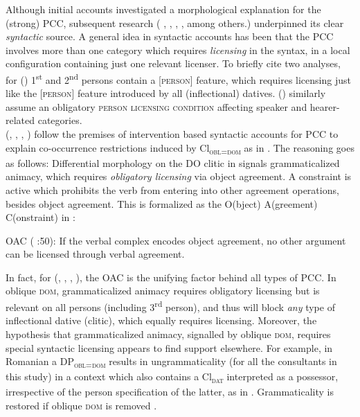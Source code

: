 \documentclass[output=paper,colorlinks,citecolor=brown,draft,draftmode]{langscibook}
\begin{document}
Although initial accounts investigated a morphological explanation for the (strong) \textsc{PCC}, subsequent research (\citeauthor{albizu1997} \citeyear{albizu1997}, \citeauthor{anag2003} \citeyear{anag2003}, \citeauthor{BejRez2003} \citeyear{BejRez2003}, \citeauthor{prem19} \citeyear{prem19}, among others.)
underpinned its clear \textit{syntactic} source. A general idea in syntactic accounts has been that the \textsc{PCC} involves more than one category which requires \textit{licensing} in the syntax, in a local configuration containing just one relevant licenser. To briefly cite two analyses, for \citeauthor{anag2003} (\citeyear{anag2003}) 1\textsuperscript{st} and 2\textsuperscript{nd} persons contain a [\textsc{person}] feature, which requires licensing just like the [\textsc{person}] feature introduced by all (inflectional) datives. \citeauthor{BejRez2003} (\citeyear{BejRez2003}) similarly assume an obligatory \textsc{person licensing condition} affecting speaker and hearer-related categories. \\
\indent \citeauthor{ormromero07} (\citeyear{ormromero07}, \citeyear{ormromero13}, \citeyear{OrmRomero2013c}, \citeyear{OrmRomero2013b}) follow the premises of intervention based syntactic accounts for \textsc{PCC} to explain co-occurrence restrictions induced by Cl\textsubscript{\textsc{obl=dom}} as in . The reasoning goes as follows: Differential morphology on the DO clitic in  signals grammaticalized animacy, which requires \textit{obligatory licensing} via object agreement. A constraint is active which prohibits the verb from entering into other agreement operations, besides object agreement. This is formalized as the  \textsc{O}(bject) \textsc{A}(greement) \textsc{C}(onstraint) in :

\ea \textsc{OAC}\label{ex:irimia:OAC} (\citeauthor{ormromero07} \citeyear{ormromero07}:50): {If the verbal complex encodes object agreement, no other argument can be licensed through verbal agreement}.
\z

In fact, for \citeauthor{ormromero07} (\citeyear{ormromero07}, \citeyear{ormromero13}, \citeyear{OrmRomero2013c}, \citeyear{OrmRomero2013b}), the \textsc{OAC} is the unifying factor behind all types of \textsc{PCC}. In oblique \textsc{dom}, grammaticalized animacy requires obligatory licensing but is relevant on all persons (including 3\textsuperscript{rd} person), and thus will block \textit{any} type of inflectional dative (clitic), which equally requires licensing. Moreover, the hypothesis that grammaticalized animacy, signalled by  oblique \textsc{dom}, requires special syntactic licensing appears to find support elsewhere. For example, in Romanian a DP\textsubscript{\textsc{obl=dom}} results in ungrammaticality (for all the consultants in this study) in a context which also contains a Cl\textsubscript{\textsc{dat}} interpreted as a possessor, irrespective of the person specification of the latter, as in . Grammaticality is restored if oblique \textsc{dom} is removed .
\end{document}
